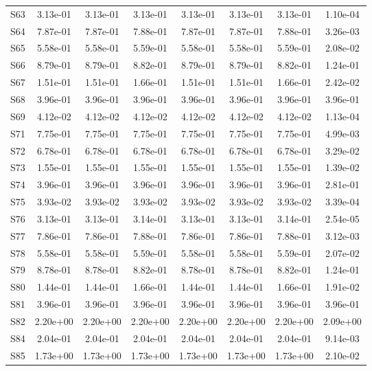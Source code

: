 {\begin{longtable}{l S[table-format=1.2e+2] S[table-format=1.2e+2] S[table-format=1.2e+2] S[table-format=1.2e+2] S[table-format=1.2e+2] S[table-format=1.2e+2] S[table-format=1.2e+2]}
S63 & 3.13e-01 & 3.13e-01 & 3.13e-01 & 3.13e-01 & 3.13e-01 & 3.13e-01 & 1.10e-04 \\
S64 & 7.87e-01 & 7.87e-01 & 7.88e-01 & 7.87e-01 & 7.87e-01 & 7.88e-01 & 3.26e-03 \\
S65 & 5.58e-01 & 5.58e-01 & 5.59e-01 & 5.58e-01 & 5.58e-01 & 5.59e-01 & 2.08e-02 \\
S66 & 8.79e-01 & 8.79e-01 & 8.82e-01 & 8.79e-01 & 8.79e-01 & 8.82e-01 & 1.24e-01 \\
S67 & 1.51e-01 & 1.51e-01 & 1.66e-01 & 1.51e-01 & 1.51e-01 & 1.66e-01 & 2.42e-02 \\
S68 & 3.96e-01 & 3.96e-01 & 3.96e-01 & 3.96e-01 & 3.96e-01 & 3.96e-01 & 3.96e-01 \\
S69 & 4.12e-02 & 4.12e-02 & 4.12e-02 & 4.12e-02 & 4.12e-02 & 4.12e-02 & 1.13e-04 \\
S71 & 7.75e-01 & 7.75e-01 & 7.75e-01 & 7.75e-01 & 7.75e-01 & 7.75e-01 & 4.99e-03 \\
S72 & 6.78e-01 & 6.78e-01 & 6.78e-01 & 6.78e-01 & 6.78e-01 & 6.78e-01 & 3.29e-02 \\
S73 & 1.55e-01 & 1.55e-01 & 1.55e-01 & 1.55e-01 & 1.55e-01 & 1.55e-01 & 1.39e-02 \\
S74 & 3.96e-01 & 3.96e-01 & 3.96e-01 & 3.96e-01 & 3.96e-01 & 3.96e-01 & 2.81e-01 \\
S75 & 3.93e-02 & 3.93e-02 & 3.93e-02 & 3.93e-02 & 3.93e-02 & 3.93e-02 & 3.39e-04 \\
S76 & 3.13e-01 & 3.13e-01 & 3.14e-01 & 3.13e-01 & 3.13e-01 & 3.14e-01 & 2.54e-05 \\
S77 & 7.86e-01 & 7.86e-01 & 7.88e-01 & 7.86e-01 & 7.86e-01 & 7.88e-01 & 3.12e-03 \\
S78 & 5.58e-01 & 5.58e-01 & 5.59e-01 & 5.58e-01 & 5.58e-01 & 5.59e-01 & 2.07e-02 \\
S79 & 8.78e-01 & 8.78e-01 & 8.82e-01 & 8.78e-01 & 8.78e-01 & 8.82e-01 & 1.24e-01 \\
S80 & 1.44e-01 & 1.44e-01 & 1.66e-01 & 1.44e-01 & 1.44e-01 & 1.66e-01 & 1.91e-02 \\
S81 & 3.96e-01 & 3.96e-01 & 3.96e-01 & 3.96e-01 & 3.96e-01 & 3.96e-01 & 3.96e-01 \\
S82 & 2.20e+00 & 2.20e+00 & 2.20e+00 & 2.20e+00 & 2.20e+00 & 2.20e+00 & 2.09e+00 \\
S84 & 2.04e-01 & 2.04e-01 & 2.04e-01 & 2.04e-01 & 2.04e-01 & 2.04e-01 & 9.14e-03 \\
S85 & 1.73e+00 & 1.73e+00 & 1.73e+00 & 1.73e+00 & 1.73e+00 & 1.73e+00 & 2.10e-02 \\

\end{longtable}}
